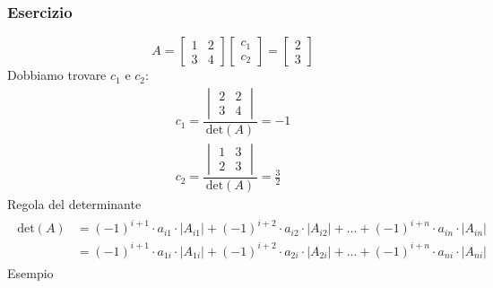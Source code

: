 \documentclass[italian]{article}
\renewcommand{\det}[1]{\text{det$\left(#1\right)$}}
\begin{document}
\subsubsection{Esercizio}
\[
	A = 
	\begin{bmatrix}
		1 & 2 \\ 3 & 4
	\end{bmatrix}
	\begin{bmatrix}
		c_1 \\ c_2
	\end{bmatrix}
	=
	\begin{bmatrix}
		2 \\ 3
	\end{bmatrix}
\]
Dobbiamo trovare $c_1$ e $c_2$:
\begin{gather*}
	c_1 = \dfrac{\begin{vmatrix} 2 & 2\\3 & 4\end{vmatrix}}{\det{A}} = -1\\[2mm]
	c_2 = \dfrac{\begin{vmatrix} 1 & 3\\2 & 3\end{vmatrix}}{\det{A}} = \frac{3}{2}
\end{gather*}
Regola del determinante
\begin{gather*}
	\begin{split}
	 \det{A} &= (-1)^{i+1}\cdot a_{i1}\cdot |A_{i1}|+(-1)^{i+2}\cdot a_{i2}\cdot |A_{i2}| + ... + (-1)^{i+n}\cdot a_{in}\cdot |A_{in}|\\
	 &= (-1)^{i+1}\cdot a_{1i}\cdot |A_{1i}|+(-1)^{i+2}\cdot a_{2i}\cdot |A_{2i}| + ... + (-1)^{i+n}\cdot a_{ni}\cdot |A_{ni}|
	\end{split}
\end{gather*}
Esempio
\end{document}
